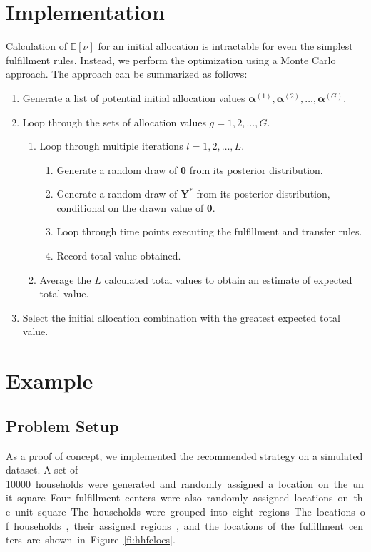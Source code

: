 \documentclass[11pt, oneside]{article}   	%
\begin{document}
\section{Implementation}

Calculation of $\mathbb{E}[\nu]$ for an initial allocation is intractable for even the simplest fulfillment rules.  Instead, we perform the optimization using a Monte Carlo approach.  The approach can be summarized as follows:

\begin{enumerate}
\item Generate a list of potential initial allocation values $\boldsymbol{\alpha}^{(1)}, \boldsymbol{\alpha}^{(2)}, \ldots, \boldsymbol{\alpha}^{(G)}$.
\item Loop through the sets of allocation values $g = 1, 2, \ldots, G$.
\begin{enumerate}
\item Loop through multiple iterations $l = 1, 2, \ldots, L$.
\begin{enumerate}
\item Generate a random draw of $\boldsymbol{\theta}$ from its posterior distribution.
\item Generate a random draw of $\mathbf{Y}^*$ from its posterior distribution, conditional on the drawn value of $\boldsymbol{\theta}$.
\item Loop through time points executing the fulfillment and transfer rules.
\item Record total value obtained.
\end{enumerate}
\item Average the $L$ calculated total values to obtain an estimate of expected total value.
\end{enumerate}
\item Select the initial allocation combination with the greatest expected total value.
\end{enumerate}

\section{Example}

\subsection{Problem Setup}

As a proof of concept, we implemented the recommended strategy on a simulated dataset.  A set of \SI{10000} households were generated and randomly assigned a location on the unit square.  Four fulfillment centers were also randomly assigned locations on the unit square.  The households were grouped into eight regions.  The locations of households, their assigned regions, and the locations of the fulfillment centers are shown in Figure~\ref{fi:hhfclocs}.
\end{document}
